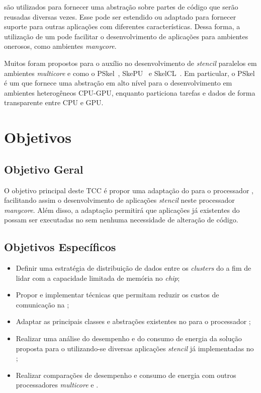 
\Fws são utilizados para fornecer uma abstração sobre partes de código que serão
reusadas diversas vezes. Esse \fw pode ser estendido ou adaptado para fornecer
suporte para outras aplicações com diferentes características. Dessa forma, a
utilização de um \fw pode facilitar o desenvolvimento de aplicações para
ambientes onerosos, como ambientes \textit{manycore}.

Muitos \fws foram propostos para o auxílio no desenvolvimento de
\textit{stencil} paralelos em ambientes \textit{multicore} e \gpu como o
PSkel~\cite{pereira15}, SkePU~\cite{enmyren10} e SkelCL~\cite{steuwer11}. Em
particular, o PSkel é um \fw que fornece uma abstração em alto nível para o
desenvolvimento em ambientes heterogêneos CPU-GPU, enquanto particiona tarefas e
dados de forma transparente entre CPU e GPU.

\section{Objetivos}
\subsection{Objetivo Geral}

O objetivo principal deste TCC é propor uma adaptação do \fw \pskel para o processador \mppa,
facilitando assim o desenvolvimento de aplicações \textit{stencil} neste processador \textit{manycore}.
Além disso, a adaptação permitirá que aplicações já existentes do \pskel possam ser executadas
no \mppa sem nenhuma necessidade de alteração de código.

\subsection{Objetivos Específicos}

\begin{itemize}
	\item Definir uma estratégia de distribuição de dados entre os \textit{clusters} do \mppa a fim de
	lidar com a capacidade limitada de memória no \textit{chip};
	\item Propor e implementar técnicas que permitam reduzir os custos de comunicação na \noc;
	\item Adaptar as principais classes e abstrações existentes no \pskel para o processador \mppa;
	\item Realizar uma análise do desempenho e do consumo de energia da solução proposta para o \mppa
	utilizando-se diversas aplicações \textit{stencil} já implementadas no \pskel;
	\item Realizar comparações de desempenho e consumo de energia com outros processadores \textit{multicore}
	e \gpus.
\end{itemize}

